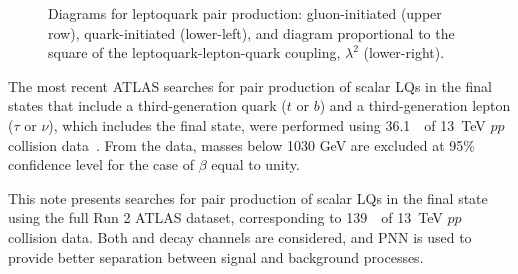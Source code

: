 \begin{figure}[!h]
\caption{Diagrams for leptoquark pair production: gluon-initiated (upper row), quark-initiated (lower-left), and diagram proportional to the square of the leptoquark-lepton-quark coupling, $\lambda^2$ (lower-right).}
        \label{fig:LQProductionFeynmanDiagrams}
\end{figure}

The most recent ATLAS searches for pair production of scalar LQs in the final states that include a third-generation quark ($t$ or $b$) and a third-generation lepton ($\tau$ or $\nu$), which includes the \btbt final state, were performed using 36.1~\ifb\ of 13~TeV $pp$ collision data~\cite{EXOT-2017-30}. From the data, masses below 1030 GeV are excluded at 95\% confidence level for the case of $\beta$ equal to unity.

This note presents searches for pair production of scalar LQs in the \btbt final state using the full Run 2 ATLAS dataset, corresponding to 139~\ifb\ of 13~TeV $pp$ collision data. Both \lephad and \hadhad decay channels are considered, and PNN is used to provide better separation between signal and background processes.
